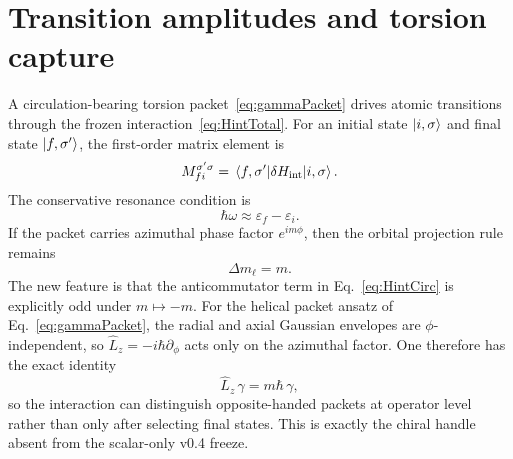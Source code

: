 \documentclass[11pt,a4paper]{article}
\begin{document}
\section{Transition amplitudes and torsion capture}
A circulation-bearing torsion packet~\eqref{eq:gammaPacket} drives atomic transitions through the frozen interaction~\eqref{eq:HintTotal}. For an initial state $\ket{i,\sigma}$ and final state $\ket{f,\sigma'}$, the first-order matrix element is
\begin{equation}
\label{eq:Mfi}
M_{fi}^{\sigma'\sigma}=\matrixel{f,\sigma'}{\delta H_{\rm int}}{i,\sigma}.
\end{equation}
The conservative resonance condition is
\begin{equation}
\label{eq:resonance}
\hbar\omega \approx \varepsilon_f-\varepsilon_i.
\end{equation}
If the packet carries azimuthal phase factor $e^{im\phi}$, then the orbital projection rule remains
\begin{equation}
\label{eq:dm}
\Delta m_\ell = m.
\end{equation}
The new feature is that the anticommutator term in Eq.~\eqref{eq:HintCirc} is explicitly odd under $m\mapsto -m$. For the helical packet ansatz of Eq.~\eqref{eq:gammaPacket}, the radial and axial Gaussian envelopes are $\phi$-independent, so $\hat L_z=-i\hbar\partial_\phi$ acts only on the azimuthal factor. One therefore has the exact identity
\begin{equation}
\label{eq:Lzgamma}
\hat L_z\,\gamma = m\hbar\,\gamma,
\end{equation}
so the interaction can distinguish opposite-handed packets at operator level rather than only after selecting final states. This is exactly the chiral handle absent from the scalar-only v0.4 freeze.
\end{document}
